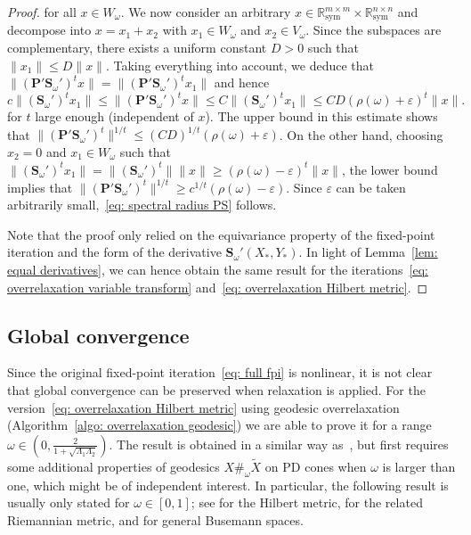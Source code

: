 \documentclass[a4paper]{article}
\newcommand{\R}{\mathbb{R}}
\newcommand{\bS}{\mathbf{S}}
\newcommand{\bP}{\mathbf{P}}
\theoremstyle{definition}
\numberwithin{equation}{section}
\begin{document}
\begin{proof}
for all $x \in W_\omega$. We now consider an arbitrary $x \in \R^{m\times m}_{\mathrm{sym}} \times \R^{n\times n}_{\mathrm{sym}}$ and decompose into $x = x_1 + x_2$ with $x_1 \in W_\omega$ and $x_2 \in V_\omega$. Since the subspaces are complementary, there exists a uniform constant $D > 0$ such that $\| x_1 \| \le D \| x \|$. Taking everything into account, we deduce that $\| (\bP' \bS_\omega')^t x \| = \| (\bP' \bS_\omega')^t x_1 \|$ and hence
\[
 c \| (\bS_\omega')^t x_1 \| \le \| (\bP' \bS_\omega')^t x \| \le C \| (\bS_\omega')^t x_1 \| \le CD (\rho(\omega) + \varepsilon)^t \| x \|. 
\]
for $t$ large enough (independent of $x$). The upper bound in this estimate shows that $\| (\bP' \bS_\omega')^t \|^{1/t} \le (CD)^{1/t}(\rho(\omega) + \varepsilon)$. On the other hand, choosing $x_2 = 0$ and $x_1 \in W_\omega$ such that $\| (\bS_\omega')^t x_1 \| = \| (\bS_\omega')^t \| \| x \| \ge (\rho(\omega) - \varepsilon)^t \| x \|$, the lower bound implies that $\| (\bP' \bS_\omega')^t \|^{1/t} \ge c^{1/t} (\rho(\omega) - \varepsilon)$. Since $\varepsilon$ can be taken arbitrarily small,~\eqref{eq: spectral radius PS} follows.

Note that the proof only relied on the equivariance property of the fixed-point iteration and the form of the derivative $\bS_\omega'(X_*,Y_*)$. In light of Lemma~\ref{lem: equal derivatives}, we can hence obtain the same result for the iterations~\eqref{eq: overrelaxation variable transform} and~\eqref{eq: overrelaxation Hilbert metric}.
\end{proof}

\subsection{Global convergence}\label{sec: global convergence}

Since the original fixed-point iteration~\eqref{eq: full fpi} is nonlinear, it is not clear that global convergence can be preserved when relaxation is applied. For the version~\eqref{eq: overrelaxation Hilbert metric} using geodesic overrelaxation (Algorithm~\ref{algo: overrelaxation geodesic}) we are able to prove it for a range $\omega \in (0,\frac{2}{1 + \sqrt{\Lambda_1 \Lambda_2}})$. The result is obtained in a similar way as~\cite[Theorem~3]{Lehmann2022}, but first requires some additional properties of geodesics $X \#_\omega \tilde X$ on PD cones when $\omega$ is larger than one, which might be of independent interest. In particular, the following result is usually only stated for $\omega \in [0,1]$; see \cite[Corollary 1.1]{Gunawardena2003} for the Hilbert metric, \cite[Corollary~6.1.11]{Bhatia2007} for the related Riemannian metric, and \cite[Proposition~1.1.5]{Bacak2014} for general Busemann spaces. 
\end{document}
